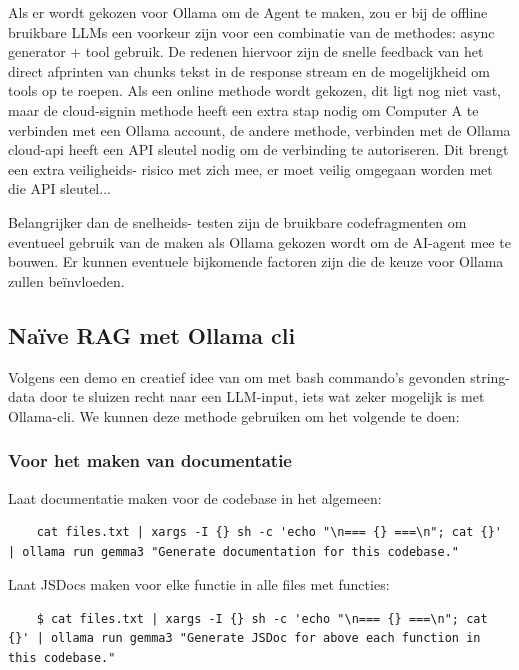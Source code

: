 Als er wordt gekozen voor Ollama om de Agent te maken, zou er bij de offline bruikbare LLMs een voorkeur zijn voor een combinatie van de methodes: async generator + tool gebruik. De redenen hiervoor zijn de snelle feedback van het direct afprinten van chunks tekst in de response stream en de mogelijkheid om tools op te roepen. Als een online methode wordt gekozen, dit ligt nog niet vast, maar de cloud-signin methode heeft een extra stap nodig om Computer A te verbinden met een Ollama account, de andere methode, verbinden met de Ollama cloud-api heeft een API sleutel nodig om de verbinding te autoriseren. Dit brengt een extra veiligheids- risico met zich mee, er moet veilig omgegaan worden met die API sleutel...

Belangrijker dan de snelheids- testen zijn de bruikbare codefragmenten om eventueel gebruik van de maken als Ollama gekozen wordt om de AI-agent mee te bouwen. Er kunnen eventuele bijkomende factoren zijn die de keuze voor Ollama zullen beïnvloeden.

\subsection{Naïve RAG met Ollama cli}
\label{ssec:naiverag}
Volgens een demo en creatief idee van \autocite{Galea2025} om met bash commando's gevonden string-data door te sluizen recht naar een LLM-input, iets wat zeker mogelijk is met Ollama-cli. We kunnen deze methode gebruiken om het volgende te doen:

\subsubsection{Voor het maken van documentatie}
\label{sssec:voorhetmakenvandocumentatie}
Laat documentatie maken voor de codebase in het algemeen:
\begin{verbatim}
    cat files.txt | xargs -I {} sh -c 'echo "\n=== {} ===\n"; cat {}' | ollama run gemma3 "Generate documentation for this codebase."
\end{verbatim}

Laat JSDocs maken voor elke functie in alle files met functies:
\begin{verbatim}
    $ cat files.txt | xargs -I {} sh -c 'echo "\n=== {} ===\n"; cat {}' | ollama run gemma3 "Generate JSDoc for above each function in this codebase."
\end{verbatim}

